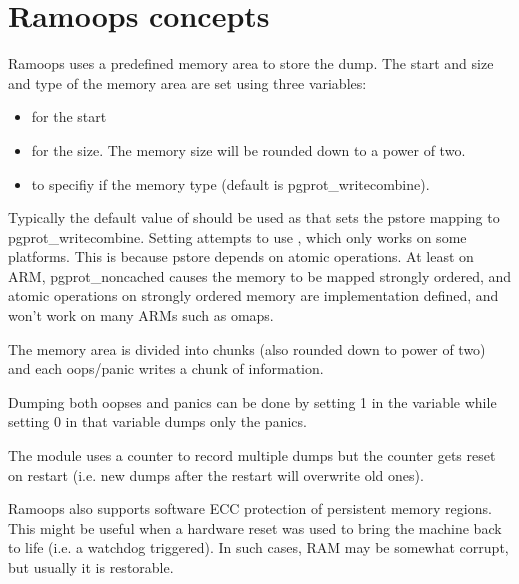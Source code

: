 \documentclass[a4paper,8pt,english]{sphinxmanual}
\begin{document}
\section{Ramoops concepts}
\label{admin-guide/ramoops:ramoops-concepts}
Ramoops uses a predefined memory area to store the dump. The start and size
and type of the memory area are set using three variables:
\begin{itemize}
\item {} 
 for the start

\item {} 
 for the size. The memory size will be rounded down to a
power of two.

\item {} 
 to specifiy if the memory type (default is pgprot\_writecombine).

\end{itemize}

Typically the default value of  should be used as that sets the pstore
mapping to pgprot\_writecombine. Setting  attempts to use
, which only works on some platforms. This is because pstore
depends on atomic operations. At least on ARM, pgprot\_noncached causes the
memory to be mapped strongly ordered, and atomic operations on strongly ordered
memory are implementation defined, and won't work on many ARMs such as omaps.

The memory area is divided into  chunks (also rounded down to
power of two) and each oops/panic writes a  chunk of
information.

Dumping both oopses and panics can be done by setting 1 in the 
variable while setting 0 in that variable dumps only the panics.

The module uses a counter to record multiple dumps but the counter gets reset
on restart (i.e. new dumps after the restart will overwrite old ones).

Ramoops also supports software ECC protection of persistent memory regions.
This might be useful when a hardware reset was used to bring the machine back
to life (i.e. a watchdog triggered). In such cases, RAM may be somewhat
corrupt, but usually it is restorable.
\end{document}
